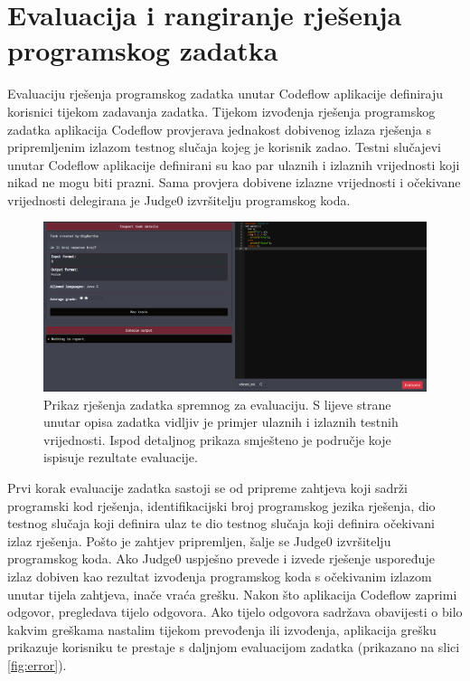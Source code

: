 \documentclass[times, utf8, zavrsni, numeric]{fer}
\begin{document}
	\chapter{Evaluacija i rangiranje rješenja programskog zadatka}
	Evaluaciju rješenja programskog zadatka unutar Codeflow aplikacije definiraju korisnici tijekom zadavanja zadatka. Tijekom izvođenja rješenja programskog zadatka aplikacija Codeflow provjerava jednakost dobivenog izlaza rješenja s pripremljenim izlazom testnog slučaja kojeg je korisnik zadao. Testni slučajevi unutar Codeflow aplikacije definirani su kao par ulaznih i izlaznih vrijednosti koji nikad ne mogu biti prazni. Sama provjera dobivene izlazne vrijednosti i očekivane vrijednosti delegirana je Judge0 izvršitelju programskog koda.\\
	\begin{figure}[H]
		\centering
		\includegraphics[width=\linewidth]{pictures/evaluacija/pocetak.png}
		\caption{Prikaz rješenja zadatka spremnog za evaluaciju. S lijeve strane unutar opisa zadatka vidljiv je primjer ulaznih i izlaznih testnih vrijednosti. Ispod detaljnog prikaza smješteno je područje koje ispisuje rezultate evaluacije.}
		\label{fig:start}
	\end{figure}
	Prvi korak evaluacije zadatka sastoji se od pripreme zahtjeva koji sadrži programski kod rješenja, identifikacijski broj programskog jezika rješenja, dio testnog slučaja koji definira ulaz te dio testnog slučaja koji definira očekivani izlaz rješenja. Pošto je zahtjev pripremljen, šalje se Judge0 izvršitelju programskog koda. Ako Judge0 uspješno prevede i izvede rješenje uspoređuje izlaz dobiven kao rezultat izvođenja programskog koda s očekivanim izlazom unutar tijela zahtjeva, inače vraća grešku. Nakon što aplikacija Codeflow zaprimi odgovor, pregledava tijelo odgovora. Ako tijelo odgovora sadržava obavijesti o bilo kakvim greškama nastalim tijekom prevođenja ili izvođenja, aplikacija grešku prikazuje korisniku te prestaje s daljnjom evaluacijom zadatka (prikazano na slici \ref{fig:error}).
\end{document}
